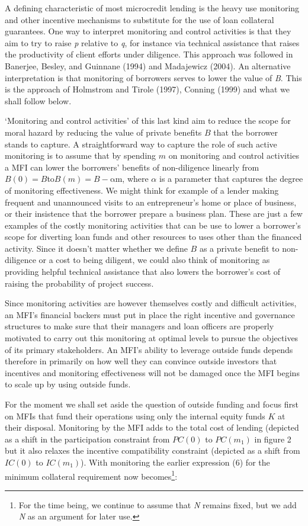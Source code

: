\documentclass[
]{article}
\begin{document}
A defining characteristic of most microcredit lending is the heavy use
monitoring and other incentive mechanisms to substitute for the use of
loan collateral guarantees. One way to interpret monitoring and control
activities is that they aim to try to raise \emph{p} relative to
\emph{q}, for instance via technical assistance that raises the
productivity of client efforts under diligence. This approach was
followed in Banerjee, Besley, and Guinnane (1994) and Madajewicz (2004).
An alternative interpretation is that monitoring of borrowers serves to
lower the value of \emph{B}. This is the approach of Holmstrom and
Tirole (1997), Conning (1999) and what we shall follow below.

`Monitoring and control activities' of this last kind aim to reduce the
scope for moral hazard by reducing the value of private benefits \(B\)
that the borrower stands to capture. A straightforward way to capture
the role of such active monitoring is to assume that by spending \(m\)
on monitoring and control activities a MFI can lower the borrowers'
benefits of non-diligence linearly from
\(B(0) = B\)to\(B(m) = B - \text{αm}\), where \(\alpha\) is a parameter
that captures the degree of monitoring effectiveness. We might think for
example of a lender making frequent and unannounced visits to an
entrepreneur's home or place of business, or their insistence that the
borrower prepare a business plan. These are just a few examples of the
costly monitoring activities that can be use to lower a borrower's scope
for diverting loan funds and other resources to uses other than the
financed activity. Since it doesn't matter whether we define \(B\) as a
private benefit to non-diligence or a cost to being diligent, we could
also think of monitoring as providing helpful technical assistance that
also lowers the borrower's cost of raising the probability of project
success.

Since monitoring activities are however themselves costly and difficult
activities, an MFI's financial backers must put in place the right
incentive and governance structures to make sure that their managers and
loan officers are properly motivated to carry out this monitoring at
optimal levels to pursue the objectives of its primary stakeholders. An
MFI's ability to leverage outside funds depends therefore in primarily
on how well they can convince outside investors that incentives and
monitoring effectiveness will not be damaged once the MFI begins to
scale up by using outside funds.

For the moment we shall set aside the question of outside funding and
focus first on MFIs that fund their operations using only the internal
equity funds \(K\) at their disposal. Monitoring by the MFI adds to the
total cost of lending (depicted as a shift in the participation
constraint from \(PC(0)\) to \(PC(m_{1})\) in figure 2 but it also
relaxes the incentive compatibility constraint (depicted as a shift from
\(IC(0)\) to \(IC(m_{1})\)). With monitoring the earlier expression (6)
for the minimum collateral requirement now becomes\footnote{For the time
  being, we continue to assume that \emph{N} remains fixed, but we add
  \emph{N} as an argument for later use.}:
\end{document}
